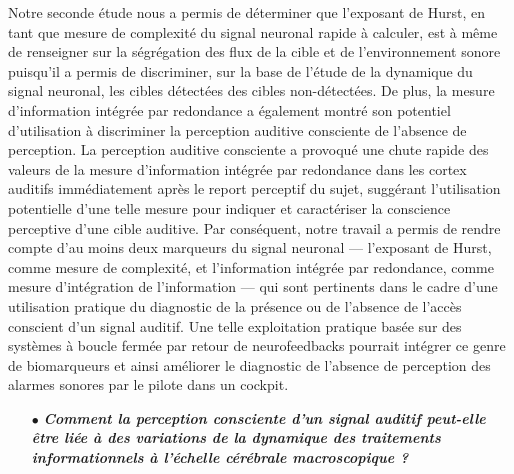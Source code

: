 Notre seconde étude nous a permis de déterminer que l'exposant de Hurst, en tant que mesure de complexité du signal neuronal rapide à calculer, est à même de renseigner sur la ségrégation des flux de la cible et de l'environnement sonore puisqu'il a permis de discriminer, sur la base de l'étude de la dynamique du signal neuronal, les cibles détectées des cibles non-détectées. 
De plus, la mesure d'information intégrée par redondance a également montré son potentiel d'utilisation à discriminer la perception auditive consciente de l'absence de perception. 
La perception auditive consciente a provoqué une chute rapide des valeurs de la mesure d'information intégrée par redondance dans les cortex auditifs immédiatement après le report perceptif du sujet, suggérant l'utilisation potentielle d'une telle mesure pour indiquer et caractériser la conscience perceptive d'une cible auditive. 
Par conséquent, notre travail a permis de rendre compte d'au moins deux marqueurs du signal neuronal --- l'exposant de Hurst, comme mesure de complexité, et l'information intégrée par redondance, comme mesure d'intégration de l'information --- qui sont pertinents dans le cadre d'une utilisation pratique du diagnostic de la présence ou de l'absence de l'accès conscient d'un signal auditif. 
Une telle exploitation pratique basée sur des systèmes à boucle fermée par retour de neurofeedbacks pourrait intégrer ce genre de biomarqueurs et ainsi améliorer le diagnostic de l'absence de perception des alarmes sonores par le pilote dans un cockpit. \\

\begin{itemize}
\item[$\bullet$] \textit{\textbf{Comment la perception consciente d'un signal auditif peut-elle être liée à des variations de la dynamique des traitements informationnels à l'échelle cérébrale macroscopique ? }} \\
\end{itemize}

